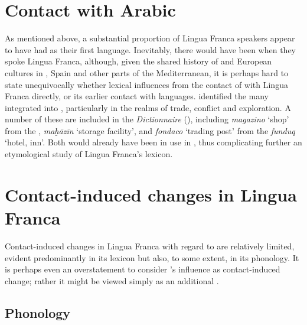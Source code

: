 \documentclass[output=paper]{langsci/langscibook}
\begin{document}
 \section{Contact with Arabic}
	
	As mentioned above, a substantial proportion of Lingua Franca speakers appear to have had  as their first language. Inevitably, there would have been  when they spoke Lingua Franca, although, given the shared history of  and European cultures in , Spain and other parts of the Mediterranean, it is perhaps hard to state unequivocally whether lexical influences  from the contact of  with Lingua Franca directly, or its earlier contact with  languages. \citet{Pellegrini1972} identified the many   integrated into , particularly in the realms of trade, conflict and exploration. A number of these are included in the \textit{Dictionnaire} (\citeyear{Anonymous1830}), including \textit{magazino} ‘shop’ from the , \textit{maḫāzīn} ‘storage facility’, and \textit{fondaco} ‘trading post’ from the  \textit{funduq} ‘hotel, inn’. Both would already have been in use in , thus complicating further an etymological study of Lingua Franca’s lexicon.
	

\section{Contact-induced changes in Lingua Franca}
	
	Contact-induced changes in Lingua Franca with regard to  are relatively limited, evident predominantly in its lexicon but also, to some extent, in its phonology. It is perhaps even an overstatement to consider ’s influence as contact-induced change; rather it might be viewed simply as an additional .
	
\subsection{Phonology}
	
\end{document}
